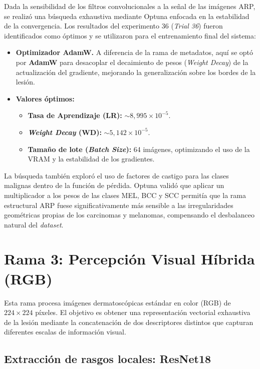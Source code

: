 Dada la sensibilidad de los filtros convolucionales a la señal de las imágenes ARP, se realizó una búsqueda exhaustiva mediante Optuna enfocada en la estabilidad de la convergencia. Los resultados del experimento 36 (\textit{Trial 36}) fueron identificados como óptimos y se utilizaron para el entrenamiento final del sistema:

\begin{itemize}
	\item \textbf{Optimizador AdamW.} A diferencia de la rama de metadatos, aquí se optó por \textbf{AdamW} para desacoplar el decaimiento de pesos (\textit{Weight Decay}) de la actualización del gradiente, mejorando la generalización sobre los bordes de la lesión.
	\item \textbf{Valores óptimos:}
	\begin{itemize}
		\item \textbf{Tasa de Aprendizaje (LR):} $\sim 8,995 \times 10^{-5}$.
		\item \textbf{\textit{Weight Decay} (WD):} $\sim 5,142 \times 10^{-5}$.
		\item \textbf{Tamaño de lote (\textit{Batch Size}):} 64 imágenes, optimizando el uso de la VRAM y la estabilidad de los gradientes.
	\end{itemize}
\end{itemize}

La búsqueda también exploró el uso de factores de castigo para las clases malignas dentro de la función de pérdida. Optuna validó que aplicar un multiplicador a los pesos de las clases MEL, BCC y SCC permitía que la rama estructural ARP fuese significativamente más sensible a las irregularidades geométricas propias de los carcinomas y melanomas, compensando el desbalanceo natural del \textit{dataset}.

\section{Rama 3: Percepción Visual Híbrida (RGB)}

Esta rama procesa imágenes dermatoscópicas estándar en color (RGB) de $224 \times 224$ píxeles. El objetivo es obtener una representación vectorial exhaustiva de la lesión mediante la concatenación de dos descriptores distintos que capturan diferentes escalas de información visual.

\subsection{Extracción de rasgos locales: ResNet18}

